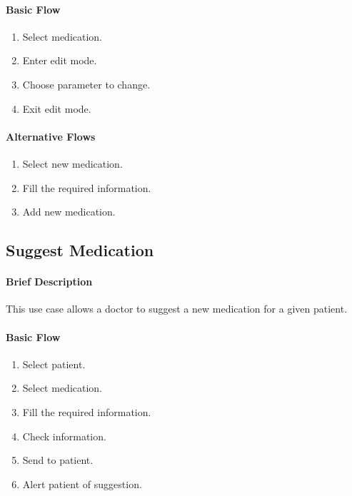 \documentclass{report}
\begin{document}
\begin{multicols}{2}
    \paragraph{Basic Flow}
    \begin{enumerate}
        \item Select medication.
        \item Enter edit mode.
        \item Choose parameter to change.
        \item Exit edit mode.
    \end{enumerate}
    \columnbreak

    \paragraph{Alternative Flows}
    \begin{enumerate}[label=A\arabic*.]
        \item Select new medication.
        \item Fill the required information.
        \item Add new medication.
    \end{enumerate}
\end{multicols}

\vspace{1em}
\subsection{Suggest Medication}
\paragraph{Brief Description}
This use case allows a doctor to suggest a new medication for a given patient.

\paragraph{Basic Flow}
\begin{enumerate}
    \item Select patient.
    \item Select medication.
    \item Fill the required information.
    \item Check information.
    \item Send to patient.
    \item Alert patient of suggestion.
\end{enumerate}
\vspace{1em}
\end{document}
